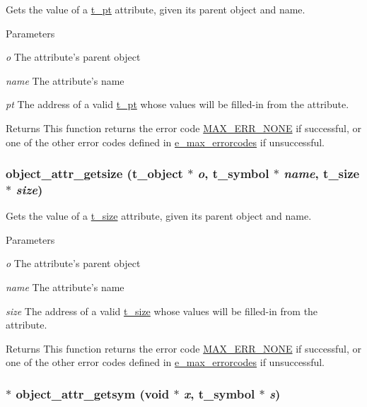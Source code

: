 Gets the value of a \hyperlink{structt__pt}{t\_\-pt} attribute, given its parent object and name. 
\begin{DoxyParams}{Parameters}
\item[{\em o}]The attribute's parent object \item[{\em name}]The attribute's name \item[{\em pt}]The address of a valid \hyperlink{structt__pt}{t\_\-pt} whose values will be filled-\/in from the attribute.\end{DoxyParams}
\begin{DoxyReturn}{Returns}
This function returns the error code \hyperlink{group__misc_gga0764dd6c02b76cca7d053ae50555d69da6d22f77fef8b1e1b074cef5d29d935fd}{MAX\_\-ERR\_\-NONE} if successful, or one of the other error codes defined in \hyperlink{group__misc_ga0764dd6c02b76cca7d053ae50555d69d}{e\_\-max\_\-errorcodes} if unsuccessful. 
\end{DoxyReturn}
\hypertarget{group__attr_ga2cd7c6bbeaad063e84db24e3b79d32c5}{
\subsubsection[{object\_\-attr\_\-getsize}]{ object\_\-attr\_\-getsize ({\bf t\_\-object} $\ast$ {\em o}, \/  {\bf t\_\-symbol} $\ast$ {\em name}, \/  {\bf t\_\-size} $\ast$ {\em size})}}
\label{group__attr_ga2cd7c6bbeaad063e84db24e3b79d32c5}


Gets the value of a \hyperlink{structt__size}{t\_\-size} attribute, given its parent object and name. 
\begin{DoxyParams}{Parameters}
\item[{\em o}]The attribute's parent object \item[{\em name}]The attribute's name \item[{\em size}]The address of a valid \hyperlink{structt__size}{t\_\-size} whose values will be filled-\/in from the attribute.\end{DoxyParams}
\begin{DoxyReturn}{Returns}
This function returns the error code \hyperlink{group__misc_gga0764dd6c02b76cca7d053ae50555d69da6d22f77fef8b1e1b074cef5d29d935fd}{MAX\_\-ERR\_\-NONE} if successful, or one of the other error codes defined in \hyperlink{group__misc_ga0764dd6c02b76cca7d053ae50555d69d}{e\_\-max\_\-errorcodes} if unsuccessful. 
\end{DoxyReturn}
\hypertarget{group__attr_ga001b1ff245bf22db3fadabd61324d1e7}{
\subsubsection[{object\_\-attr\_\-getsym}]{$\ast$ object\_\-attr\_\-getsym (void $\ast$ {\em x}, \/  {\bf t\_\-symbol} $\ast$ {\em s})}}
\label{group__attr_ga001b1ff245bf22db3fadabd61324d1e7}


